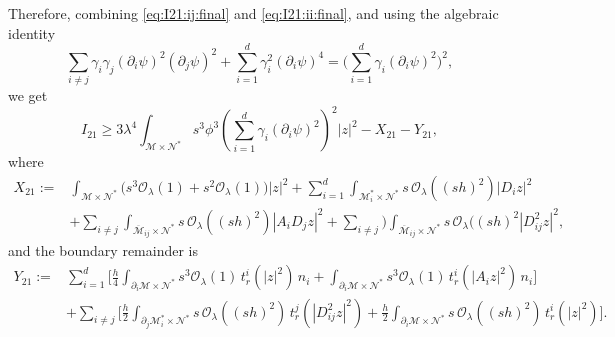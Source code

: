 \documentclass[11pt,oneside,leqno]{amsart}
\numberwithin{equation}{section}
\numberwithin{equation}{section}
\begin{document}
Therefore, combining \eqref{eq:I21:ij:final} and \eqref{eq:I21:ii:final},
and using the algebraic identity
\begin{equation*}
\sum_{i\ne j}\gamma_{i}\gamma_{j}(\partial_{i}\psi)^{2}(\partial_{j}\psi)^{2}
+\sum_{i=1}^{d}\gamma_{i}^{2}(\partial_{i}\psi)^{4}
=\bigg(\sum_{i=1}^{d}\gamma_{i}(\partial_{i}\psi)^{2}\bigg)^{2},
\end{equation*}
we get
\begin{equation}
I_{21}\geq 3\lambda^{4}\int_{\mathcal{M}\times\mathcal{N}^{\ast}}s^{3}\phi^{3}\left(\sum_{i=1}^{d}\gamma_{i}(\partial_{i}\psi)^{2}\right)^{2}|z|^{2}-X_{21}-Y_{21},
\end{equation}
where
\begin{equation}\label{eq:X21:final}
\begin{aligned}
X_{21}:=&\int_{\mathcal{M}\times\mathcal{N}^{\ast}}
\Big(s^{3}\mathcal{O}_{\lambda}(1)+s^{2}\mathcal{O}_{\lambda}(1)\Big)|z|^{2}
+\sum_{i=1}^{d}
\int_{\mathcal{M}_{i}^{\ast}\times\mathcal{N}^{\ast}}s\,\mathcal{O}_{\lambda}((sh)^{2})|D_{i}z|^{2}\\
&+\sum_{i\ne j}
\int_{\overline{\mathcal{M}}_{ij}\times\mathcal{N}^{\ast}}s\,\mathcal{O}_{\lambda}((sh)^{2})|A_{i}D_{j}z|^{2}
+\sum_{i\ne j})
\int_{\overline{\mathcal{M}}_{ij}\times\mathcal{N}^{\ast}}s\,\mathcal{O}_{\lambda}((sh)^{2}|D_{ij}^{2}z|^{2},
\end{aligned}
\end{equation}
and the boundary remainder is
\begin{equation}\label{eq:Y21:final}
\begin{aligned}
Y_{21}:=&\sum_{i=1}^{d}\bigg[\frac{h}{4}
\int_{\partial_{i}\mathcal{M}\times\mathcal{N}^{\ast}}
s^{3}\mathcal{O}_{\lambda}(1)\,t_{r}^{i}(|z|^{2})\,n_{i}
+\int_{\partial_{i}\mathcal{M}\times\mathcal{N}^{\ast}}
s^{3}\mathcal{O}_{\lambda}(1)\,t_{r}^{i}(|A_{i}z|^{2})\,n_{i}\bigg]\\
&+\sum_{i\ne j}\bigg[\frac{h}{2}
\int_{\partial_{j}\mathcal{M}_{i}^{\ast}\times\mathcal{N}^{\ast}}
s\,\mathcal{O}_{\lambda}((sh)^{2})\,t_{r}^{j}(|D_{ij}^{2}z|^{2})
+\frac{h}{2}\int_{\partial_{i}\mathcal{M}\times\mathcal{N}^{\ast}}
s\,\mathcal{O}_{\lambda}((sh)^{2})\,t_{r}^{i}(|z|^{2})\bigg].
\end{aligned}
\end{equation}

\end{document}
